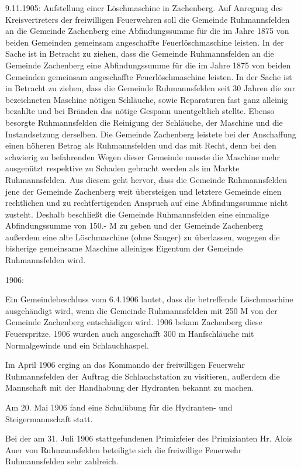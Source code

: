 \documentclass{book}
\begin{document}
9.11.1905: Aufstellung einer Löschmaschine in Zachenberg. Auf Anregung des
Kreisvertreters der freiwilligen Feuerwehren soll die Gemeinde Ruhmannsfelden an
die Gemeinde Zachenberg eine Abfindungssumme für die im Jahre 1875 von beiden
Gemeinden gemeinsam angeschaffte Feuerlöschmaschine leisten. In der Sache ist in
Betracht zu ziehen, dass die Gemeinde Ruhmannsfelden an die Gemeinde Zachenberg
eine Abfindungssumme für die im Jahre 1875 von beiden Gemeinden gemeinsam
angeschaffte Feuerlöschmaschine leisten. In der Sache ist in Betracht zu ziehen,
dass die Gemeinde Ruhmannsfelden seit 30 Jahren die zur bezeichneten Maschine
nötigen Schläuche, sowie Reparaturen fast ganz alleinig bezahlte und bei Bränden
das nötige Gespann unentgeltlich stellte. Ebenso besorgte Ruhmannsfelden die
Reinigung der Schläuche, der Maschine und die Instandsetzung derselben. Die
Gemeinde Zachenberg leistete bei der Anschaffung einen höheren Betrag als
Ruhmannsfelden und das mit Recht, denn bei den schwierig zu befahrenden Wegen
dieser Gemeinde musste die Maschine mehr ausgenützt respektive zu Schaden
gebracht werden als im Markte Ruhmannsfelden. Aus diesem geht hervor, dass die
Gemeinde Ruhmannsfelden jene der Gemeinde Zachenberg weit übersteigen und
letztere Gemeinde einen rechtlichen und zu rechtfertigenden Anspruch auf eine
Abfindungssumme nicht zusteht. Deshalb beschließt die Gemeinde Ruhmannsfelden
eine einmalige Abfindungssumme von 150.- M zu geben und der Gemeinde Zachenberg
außerdem eine alte Löschmaschine (ohne Sauger) zu überlassen, wogegen die
bisherige gemeinsame Maschine alleiniges Eigentum der Gemeinde Ruhmannsfelden
wird.

1906:

Ein Gemeindebeschluss vom 6.4.1906 lautet, dass die betreffende Löschmaschine
ausgehändigt wird, wenn die Gemeinde Ruhmannsfelden mit 250 M von der Gemeinde
Zachenberg entschädigen wird. 1906 bekam Zachenberg diese Feuerspritze. 1906
wurden auch angeschafft 300 m Hanfschläuche mit Normalgewinde und ein
Schlauchhaspel.

Im April 1906 erging an das Kommando der freiwilligen Feuerwehr Ruhmannsfelden
der Auftrag die Schlauchstation zu visitieren, außerdem die Mannschaft mit der
Handhabung der Hydranten bekannt zu machen.

Am 20. Mai 1906 fand eine Schulübung für die Hydranten- und Steigermannschaft
statt.

Bei der am 31. Juli 1906 stattgefundenen Primizfeier des Primizianten Hr. Alois
Auer von Ruhmannsfelden beteiligte sich die freiwillige Feuerwehr Ruhmannsfelden
sehr zahlreich.
\end{document}
